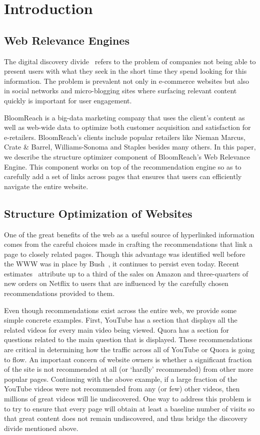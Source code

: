 \section{Introduction}

\subsection{Web Relevance Engines}
The digital discovery divide~\cite{WebRelevanceEngine} refers to the problem of companies not being able to present users with what they seek in the short time they spend looking for this information. The problem is prevalent not only in e-commerce websites but also in social networks and micro-blogging sites where surfacing relevant content quickly is important for user engagement. \vs

BloomReach is a big-data marketing company that uses the client's content as well as web-wide data to optimize both customer acquisition and satisfaction for e-retailers.
BloomReach's clients include popular retailers like Nieman Marcus, Crate \& Barrel, Williams-Sonoma and Staples besides many others. In this paper, we describe the structure optimizer component of BloomReach's Web Relevance Engine. This component works on top of the recommendation engine so as to carefully add a set of links across pages that ensures that users can efficiently navigate the entire website.

\subsection{Structure Optimization of Websites}

One of the great benefits of the web as a useful source of hyperlinked
information comes from the careful choices made in crafting the
recommendations that link a page to closely related pages. Though this
advantage was identified well before the WWW was in place by
Bush~\cite{Bush45aswe}, it continues to persist even today.
Recent estimates~\cite{big-data-book13} attribute up to a third of the sales
on Amazon and three-quarters of new orders on Netflix to users that are
influenced by the carefully chosen recommendations provided to them. \vs

Even though recommendations exist across the entire web, we provide some simple concrete examples. First, YouTube has a section that displays all the related videos for every main video being viewed.
Quora has a section for questions related to the main question that is displayed. These recommendations are critical in determining how the traffic across all of YouTube or Quora is going to flow.
An important concern of website owners is whether a significant fraction of the site is not recommended at all (or `hardly' recommended) from other more popular pages. Continuing
with the above example, if a large fraction of the YouTube videos were not recommended from any (or few) other videos, then millions of great videos will lie undiscovered. One way to address this
problem is to try to ensure that every page will obtain at least a baseline number of visits so that great content does not remain undiscovered, and thus bridge the discovery divide mentioned above. \vs

